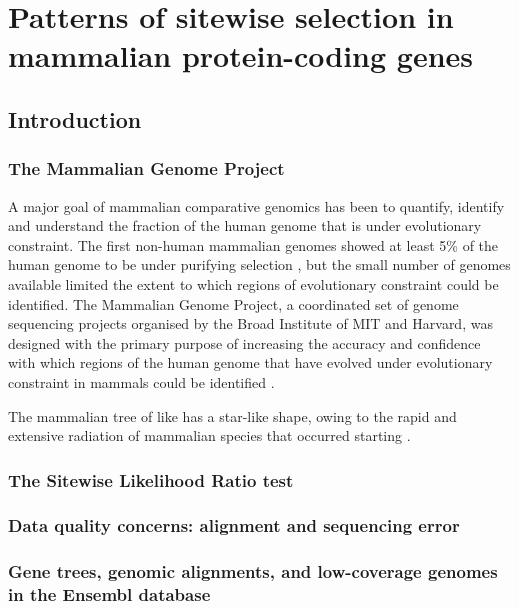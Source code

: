 \chapter{Patterns of sitewise selection in mammalian protein-coding genes}\label{ch:mammals1}

\section{Introduction}

\subsection{The Mammalian Genome Project}

\newcommand{\mgp}{Mammalian Genome Project\xspace}

A major goal of mammalian comparative genomics has been to quantify,
identify and understand the fraction of the human genome that is under
evolutionary constraint. The first non-human mammalian genomes showed
at least 5\% of the human genome to be under purifying selection
\citep{Mouse_Genome_Sequencing_Consortium2002,Gibbs2004,LindbladToh2005},
but the small number of genomes available limited the extent to which
regions of evolutionary constraint could be identified. The \mgp, a
coordinated set of genome sequencing projects organised by the Broad
Institute of MIT and Harvard, was designed with the primary purpose of
increasing the accuracy and confidence with which regions of the human
genome that have evolved under evolutionary constraint in mammals
could be identified \citep{TODO}.

The mammalian tree of like has a star-like shape, owing to the rapid
and extensive radiation of mammalian species that occurred starting .

\subsection{The Sitewise Likelihood Ratio test}

\subsection{Data quality concerns: alignment and sequencing error}

\subsection{Gene trees, genomic alignments, and low-coverage genomes in the Ensembl database}


